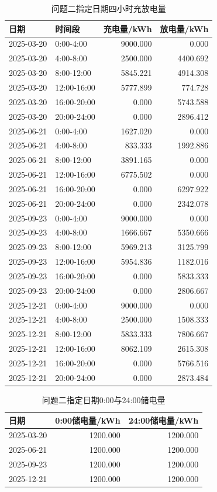 \documentclass[UTF8,12pt,a4paper]{ctexart}
\begin{document}
\begin{table}[H]\centering\scriptsize\caption{问题二指定日期四小时充放电量}\label{tab:q2storage_detail}
\begin{tabular}{llrr}\toprule 日期&时间段&充电量/kWh&放电量/kWh\\\midrule
2025-03-20&0:00-4:00&9000.000&0.000\\
2025-03-20&4:00-8:00&2500.000&4400.692\\
2025-03-20&8:00-12:00&5845.221&4914.308\\
2025-03-20&12:00-16:00&5777.899&774.728\\
2025-03-20&16:00-20:00&0.000&5743.588\\
2025-03-20&20:00-24:00&0.000&2896.412\\
2025-06-21&0:00-4:00&1627.020&0.000\\
2025-06-21&4:00-8:00&833.333&1992.886\\
2025-06-21&8:00-12:00&3891.165&0.000\\
2025-06-21&12:00-16:00&6775.502&0.000\\
2025-06-21&16:00-20:00&0.000&6297.922\\
2025-06-21&20:00-24:00&0.000&2342.078\\
2025-09-23&0:00-4:00&9000.000&0.000\\
2025-09-23&4:00-8:00&1666.667&5350.666\\
2025-09-23&8:00-12:00&5969.213&3125.799\\
2025-09-23&12:00-16:00&5954.836&1182.016\\
2025-09-23&16:00-20:00&0.000&5833.333\\
2025-09-23&20:00-24:00&0.000&2806.667\\
2025-12-21&0:00-4:00&9000.000&0.000\\
2025-12-21&4:00-8:00&2500.000&1508.333\\
2025-12-21&8:00-12:00&5833.333&7806.667\\
2025-12-21&12:00-16:00&8062.109&2615.308\\
2025-12-21&16:00-20:00&0.000&5766.516\\
2025-12-21&20:00-24:00&0.000&2873.484\\
\bottomrule\end{tabular}\end{table}
\begin{table}[H]\centering\scriptsize\caption{问题二指定日期0:00与24:00储电量}\label{tab:q2soc_detail}
\begin{tabular}{lrr}\toprule 日期&0:00储电量/kWh&24:00储电量/kWh\\\midrule
2025-03-20&1200.000&1200.000\\
2025-06-21&1200.000&1200.000\\
2025-09-23&1200.000&1200.000\\
2025-12-21&1200.000&1200.000\\
\bottomrule\end{tabular}\end{table}
\end{document}
